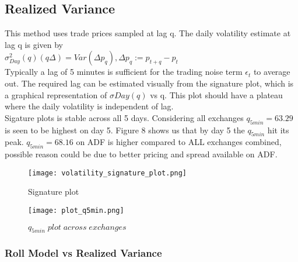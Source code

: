 \documentclass{article}
\begin{document}
\subsection{Realized Variance}

This method uses trade prices sampled at lag q. The daily volatility estimate at lag q is given by\\

$\sigma^2_{Day}(q)(q\Delta)=Var(\Delta p_q), \Delta p_q:=p_{t+q}-p_t$\\

Typically a lag of 5 minutes is sufficient for the trading noise term $\epsilon_t$ to average out. The required lag can be estimated visually from the signature plot, which is a graphical representation of $\sigma Day(q)$ vs q. This plot should have a plateau where the daily volatility is independent of lag.\\

Sigature plots is stable across all 5 days. Considering all exchanges $q_{5min}=63.29$ is seen to be highest on day 5. Figure 8 shows us that by day 5 the $q_{5min}$ hit its peak. $q_{5min}=68.16$ on ADF is higher compared to ALL exchanges combined, possible reason could be due to better pricing and spread available on ADF. 

\begin{figure}[H]
\centering
\begin{adjustbox}{max width=\textwidth}
    \texttt{[image: volatility\_signature\_plot.png]}
\end{adjustbox}
\caption{Signature plot}
\label{fig:S}
\end{figure}



\begin{figure}[H]
\centering
\begin{adjustbox}{max width=\textwidth}
    \texttt{[image: plot\_q5min.png]}
\end{adjustbox}
\caption{$q_{5min}\; plot\; across\; exchanges$}
\label{fig:q_5min_plot}
\end{figure}




\subsubsection{Roll Model vs Realized Variance}
\end{document}
